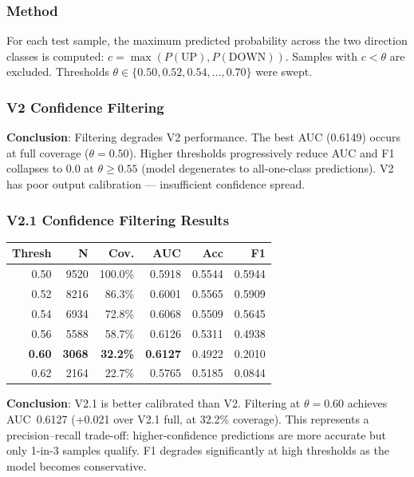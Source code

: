 \documentclass[12pt,a4paper]{article}
\begin{document}
\subsubsection{Method}
For each test sample, the maximum predicted probability across the two
direction classes is computed: $c = \max(P(\text{UP}), P(\text{DOWN}))$.
Samples with $c < \theta$ are excluded. Thresholds
$\theta \in \{0.50, 0.52, 0.54, \ldots, 0.70\}$ were swept.

\subsubsection{V2 Confidence Filtering}
\textbf{Conclusion}: Filtering degrades V2 performance.
The best AUC (0.6149) occurs at full coverage ($\theta=0.50$).
Higher thresholds progressively reduce AUC and F1 collapses to 0.0
at $\theta \geq 0.55$ (model degenerates to all-one-class predictions).
V2 has poor output calibration --- insufficient confidence spread.

\subsubsection{V2.1 Confidence Filtering Results}
\begin{center}
\begin{tabular}{rrrrrr}
\hline
\textbf{Thresh} & \textbf{N} & \textbf{Cov.} & \textbf{AUC} & \textbf{Acc} & \textbf{F1} \\
\hline
0.50 & 9520 & 100.0\% & 0.5918 & 0.5544 & 0.5944 \\
0.52 & 8216 &  86.3\% & 0.6001 & 0.5565 & 0.5909 \\
0.54 & 6934 &  72.8\% & 0.6068 & 0.5509 & 0.5645 \\
0.56 & 5588 &  58.7\% & 0.6126 & 0.5311 & 0.4938 \\
\textbf{0.60} & \textbf{3068} & \textbf{32.2\%} & \textbf{0.6127} & 0.4922 & 0.2010 \\
0.62 & 2164 &  22.7\% & 0.5765 & 0.5185 & 0.0844 \\
\hline
\end{tabular}
\end{center}

\textbf{Conclusion}: V2.1 is better calibrated than V2.
Filtering at $\theta=0.60$ achieves AUC~0.6127 (+0.021 over V2.1 full,
at 32.2\% coverage). This represents a precision--recall trade-off:
higher-confidence predictions are more accurate but only 1-in-3 samples
qualify. F1 degrades significantly at high thresholds as the model
becomes conservative.
\end{document}
